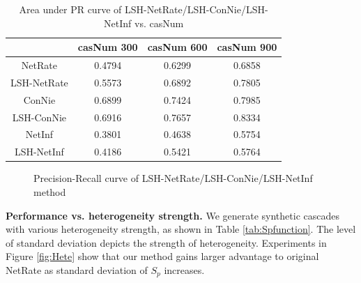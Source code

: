 \begin{table}[H]
\caption{Area under PR curve of LSH-NetRate/LSH-ConNie/LSH-NetInf vs. casNum}
\begin{tabular}{c|c|c|c}
 & casNum 300 & casNum 600 & casNum 900 \\
\hline
NetRate & 0.4794 & 0.6299 & 0.6858\\
LSH-NetRate & 0.5573 & 0.6892 & 0.7805\\
\hline
ConNie & 0.6899 & 0.7424 & 0.7985\\
LSH-ConNie & 0.6916 & 0.7657 & 0.8334\\
\hline
NetInf & 0.3801 & 0.4638 & 0.5754\\
LSH-NetInf & 0.4186 & 0.5421 & 0.5764
\end{tabular}\label{tab:synLSHCASAUC}
\end{table}
\begin{figure}
\centerline{
}
\caption{Precision-Recall curve of LSH-NetRate/LSH-ConNie/LSH-NetInf method }\label{fig:synLSHpr}
\end{figure}
\textbf{Performance vs. heterogeneity strength.} We generate synthetic cascades with various heterogeneity strength, as shown in Table \ref{tab:Spfunction}. The level of standard deviation depicts the strength of heterogeneity. Experiments in Figure \ref{fig:Hete} show that our method gains larger advantage to original NetRate as standard deviation of $S_p$ increases.
